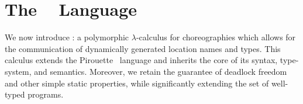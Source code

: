 \section{The \langnameraw~ Language}
\label{sec:language}
We now introduce \langname: a polymorphic $\lambda$-calculus for choreographies which allows for the communication of dynamically generated location names and types.
This calculus extends the Pirouette~\cite{HirschG22} language and inherits the core of its syntax, type-system, and semantics.
Moreover, we retain the guarantee of deadlock freedom and other simple static properties, while significantly extending the set of well-typed programs.





